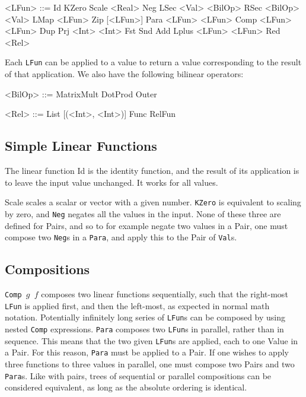 \begin{grammar}
<LFun>
  ::= Id
  \alt KZero
  \alt Scale <Real>
  \alt Neg
  \alt LSec <Val> <BilOp>
  \alt RSec <BilOp> <Val>
  \alt LMap <LFun>
  \alt Zip [<LFun>]
  \alt Para <LFun> <LFun>
  \alt Comp <LFun> <LFun>
  \alt Dup
  \alt Prj <Int> <Int>
  \alt Fst
  \alt Snd
  \alt Add
  \alt Lplus <LFun> <LFun>
  \alt Red <Rel>
\end{grammar}

Each \texttt{LFun} can be applied to a value to return a value corresponding to
the result of that application. We also have the following bilinear operators:

\begin{grammar}
<BilOp>
  ::= MatrixMult
  \alt DotProd
  \alt Outer
\end{grammar}

\begin{grammar}
  <Rel> ::= List [(<Int>, <Int>)]
  \alt Func RelFun
\end{grammar}


\subsection{Simple Linear Functions}
The linear function Id is the identity function, and the result of its
application is to leave the input value unchanged. It works for all values.

Scale scales a scalar or vector with a given number. \texttt{KZero} is equivalent to
scaling by zero, and \texttt{Neg} negates all the values in the input. None of these
three are defined for Pairs, and so to for example negate two values in a Pair,
one must compose two \texttt{Neg}s in a \texttt{Para}, and apply this to the Pair of \texttt{Val}s.

\subsection{Compositions} \texttt{Comp $g$ $f$} composes two linear functions
sequentially, such that the right-most \texttt{LFun} is applied first, and then
the left-most, as expected in normal math notation.  Potentially infinitely long
series of \texttt{LFun}s can be composed by using nested \texttt{Comp}
expressions. \texttt{Para} composes two \texttt{LFun}s in parallel, rather than in
sequence. This means that the two given \texttt{LFun}s are applied, each to one
Value in a Pair. For this reason, \texttt{Para} must be applied to a Pair. If one wishes
to apply three functions to three values in parallel, one must compose two Pairs
and two \texttt{Para}s.  Like with pairs, trees of sequential or parallel compositions
can be considered equivalent, as long as the absolute ordering is identical.

